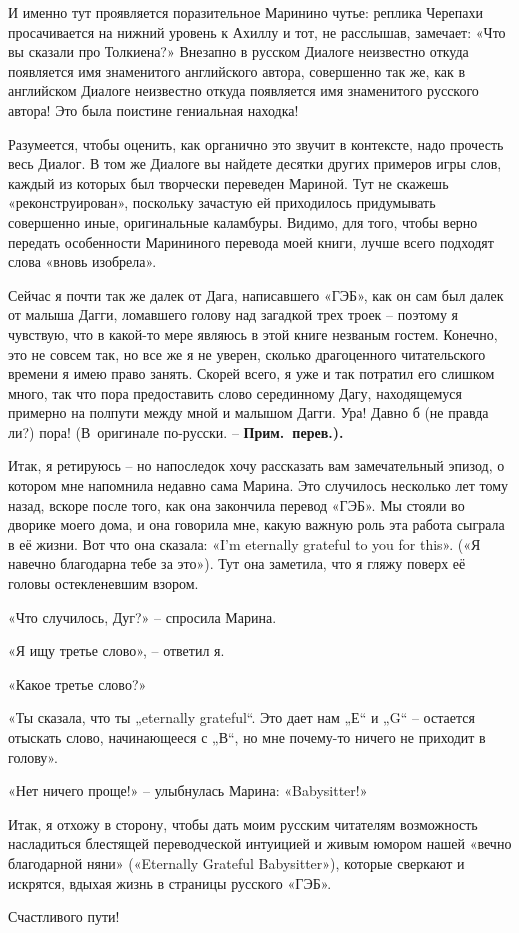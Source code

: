 \documentclass[../main.tex]{subfiles}
\begin{document}
И именно тут проявляется поразительное Маринино чутье: реплика Черепахи просачивается на нижний уровень к Ахиллу и тот, не расслышав, замечает: «Что вы сказали про Толкиена?» Внезапно в русском Диалоге неизвестно откуда появляется имя знаменитого английского автора, совершенно так же, как в английском Диалоге неизвестно откуда появляется имя знаменитого русского автора!
Это была поистине гениальная находка!

Разумеется, чтобы оценить, как органично это звучит в контексте, надо прочесть весь Диалог. В том же Диалоге вы найдете десятки других примеров игры слов, каждый из которых был творчески переведен Мариной. Тут не скажешь «реконструирован», поскольку зачастую ей приходилось придумывать совершенно иные, оригинальные каламбуры. Видимо, для того, чтобы верно передать особенности Марининого перевода моей книги, лучше всего подходят слова «вновь изобрела».

Сейчас я почти так же далек от Дага, написавшего «ГЭБ», как он сам был далек от малыша Дагги, ломавшего голову над загадкой трех троек \--- поэтому я чувствую, что в какой-то мере являюсь в этой книге незваным гостем. Конечно, это не совсем так, но все же я не уверен, сколько драгоценного читательского времени я имею право занять. Скорей всего, я уже и так потратил его слишком много, так что пора предоставить слово серединному Дагу, находящемуся примерно на полпути между мной и малышом Дагги. Ура! Давно б (не правда ли?) пора! (В~оригинале по-русски. \--- \textbf{Прим.~перев.).}

Итак, я ретируюсь \--- но напоследок хочу рассказать вам замечательный эпизод, о котором мне напомнила недавно сама Марина. Это случилось несколько лет тому назад, вскоре после того, как она закончила перевод «ГЭБ». Мы стояли во дворике моего дома, и она говорила мне, какую важную роль эта работа сыграла в её жизни. Вот что она сказала: «I'm eternally grateful to you for this». («Я навечно благодарна тебе за это»). Тут она заметила, что я гляжу поверх её головы остекленевшим взором.

«Что случилось, Дуг?» \--- спросила Марина.

«Я ищу третье слово», \--- ответил я.

«Какое третье слово?»

«Ты сказала, что ты „eternally grateful``. Это дает нам „Е`` и „G`` \--- остается отыскать слово, начинающееся с „В``, но мне почему-то ничего не приходит в голову».

«Нет ничего проще!» \--- улыбнулась Марина: «Babysitter!»

Итак, я отхожу в сторону, чтобы дать моим русским читателям возможность насладиться блестящей переводческой интуицией и живым юмором нашей «вечно благодарной няни» («Eternally Grateful Babysitter»), которые сверкают и искрятся, вдыхая жизнь в страницы русского «ГЭБ».

\null

Счастливого пути!
\end{document}
